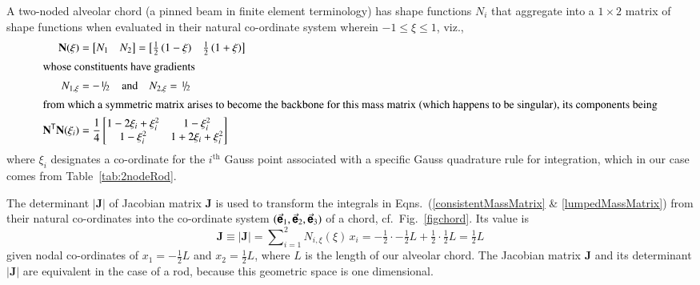 A two-noded alveolar chord (a pinned beam in finite element terminology) has shape functions $N_i$ that aggregate into a $1 \! \times \! 2$ matrix of shape functions when evaluated in their natural co-ordinate system wherein $-1 \leq \xi \leq 1$, viz.,
\begin{subequations}
    \begin{align}
    \mathbf{N} (\xi) & = \bigl[ \begin{matrix} N_1 & N_2 \end{matrix} \bigr] =
    \bigl[ \begin{matrix}
    \frac{1}{2} \, (1 - \xi) &  \frac{1}{2} \, (1 + \xi)
    \end{matrix} \bigr] \\
    \intertext{whose constituents have gradients}
    N_{1,\xi} & = -\textfrac{1}{2} 
    \quad \text{and} \quad
    N_{2,\xi} = \textfrac{1}{2} \\
    \intertext{from which a symmetric matrix arises to become the backbone for this mass matrix (which happens to be singular), its components being}
    \mathbf{N}^{\mathsf{T}} \mathbf{N} (\xi_i) & = \frac{1}{4} \begin{bmatrix}
    1 - 2\xi_i + \xi_i^2 & 1 - \xi_i^2 \\
    1 - \xi_i^2 & 1 + 2 \xi_i + \xi_i^2    
    \end{bmatrix} 
    \end{align}
\end{subequations}
where $\xi_i$ designates a co-ordinate for the $i^{\mathrm{th}}$ Gauss point associated with a specific Gauss quadrature rule for integration, which in our case comes from Table~\ref{tab:2nodeRod}.

The determinant $| \mathbf{J} |$ of Jacobian matrix $\mathbf{J}$ is used to transform the integrals in Eqns.~(\ref{consistentMassMatrix} \& \ref{lumpedMassMatrix}) from their natural co-ordinates into the co-ordinate system $( \vec{\boldsymbol{\mathsf{e}}}_1 , \vec{\boldsymbol{\mathsf{e}}}_2 , \vec{\boldsymbol{\mathsf{e}}}_3 )$ of a chord, cf.\ Fig.~\ref{figchord}.  Its value is
\begin{equation}
\mathbf{J} \equiv | \mathbf{J} | = \sum\nolimits_{i=1}^2 N_{i,\xi} (\xi) \, x_i = 
-\tfrac{1}{2} \cdot -\tfrac{1}{2} L + \tfrac{1}{2} \cdot \tfrac{1}{2} L = 
\tfrac{1}{2} L
\label{detJac1D}
\end{equation}
given nodal co-ordinates of $x_1 = -\tfrac{1}{2} L$ and $x_2 = \tfrac{1}{2} L$, where $L$ is the length of our alveolar chord.  The Jacobian matrix $\mathbf{J}$ and its determinant $| \mathbf{J} |$ are equivalent in the case of a rod, because this geometric space is one dimensional. 

